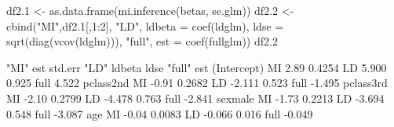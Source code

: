 \begin{Schunk}
\begin{Sinput}
 df2.1 <- as.data.frame(mi.inference(betas, se.glm))
 df2.2 <- cbind("MI",df2.1[,1:2], "LD", ldbeta = coef(ldglm), ldse = sqrt(diag(vcov(ldglm))), "full", est = coef(fullglm))
 df2.2
\end{Sinput}
\begin{Soutput}
            "MI"   est std.err "LD" ldbeta  ldse "full"    est
(Intercept)   MI  2.89  0.4254   LD  5.900 0.925   full  4.522
pclass2nd     MI -0.91  0.2682   LD -2.111 0.523   full -1.495
pclass3rd     MI -2.10  0.2799   LD -4.478 0.763   full -2.841
sexmale       MI -1.73  0.2213   LD -3.694 0.548   full -3.087
age           MI -0.04  0.0083   LD -0.066 0.016   full -0.049
\end{Soutput}
\end{Schunk}
